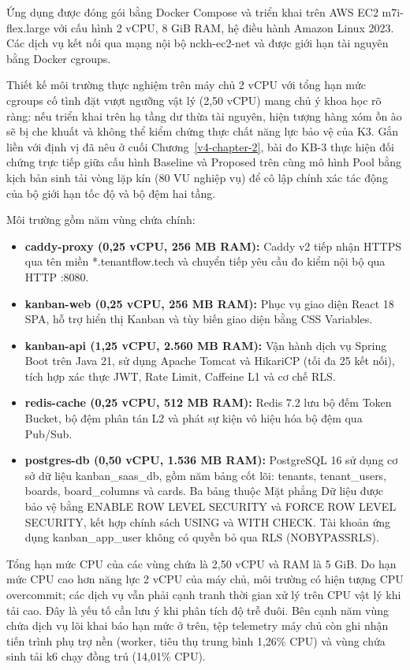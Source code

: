 Ứng dụng được đóng gói bằng Docker Compose và triển khai trên AWS EC2 m7i-flex.large với cấu hình 2 vCPU, 8 GiB RAM, hệ điều hành Amazon Linux 2023. Các dịch vụ kết nối qua mạng nội bộ nckh-ec2-net và được giới hạn tài nguyên bằng Docker cgroups.

Thiết kế môi trường thực nghiệm trên máy chủ 2 vCPU với tổng hạn mức cgroups cố tình đặt vượt ngưỡng vật lý (2,50 vCPU) mang chủ ý khoa học rõ ràng: nếu triển khai trên hạ tầng dư thừa tài nguyên, hiện tượng hàng xóm ồn ào sẽ bị che khuất và không thể kiểm chứng thực chất năng lực bảo vệ của K3. Gắn liền với định vị đã nêu ở cuối Chương~\ref{v4-chapter-2}, bài đo KB-3 thực hiện đối chứng trực tiếp giữa cấu hình Baseline và Proposed trên cùng mô hình Pool bằng kịch bản sinh tải vòng lặp kín (80 VU nghiệp vụ) để cô lập chính xác tác động của bộ giới hạn tốc độ và bộ đệm hai tầng.

Môi trường gồm năm vùng chứa chính:

\begin{itemize}
\tightlist
\item
  \textbf{caddy-proxy (0,25 vCPU, 256 MB RAM):} Caddy v2 tiếp nhận HTTPS qua tên miền *.tenantflow.tech và chuyển tiếp yêu cầu đo kiểm nội bộ qua HTTP :8080.
\item
  \textbf{kanban-web (0,25 vCPU, 256 MB RAM):} Phục vụ giao diện React 18 SPA, hỗ trợ hiển thị Kanban và tùy biến giao diện bằng CSS Variables.
\item
  \textbf{kanban-api (1,25 vCPU, 2.560 MB RAM):} Vận hành dịch vụ Spring Boot trên Java 21, sử dụng Apache Tomcat và HikariCP (tối đa 25 kết nối), tích hợp xác thực JWT, Rate Limit, Caffeine L1 và cơ chế RLS.
\item
  \textbf{redis-cache (0,25 vCPU, 512 MB RAM):} Redis 7.2 lưu bộ đếm Token Bucket, bộ đệm phân tán L2 và phát sự kiện vô hiệu hóa bộ đệm qua Pub/Sub.
\item
  \textbf{postgres-db (0,50 vCPU, 1.536 MB RAM):} PostgreSQL 16 sử dụng cơ sở dữ liệu kanban\_\allowbreak{}saas\_\allowbreak{}db, gồm năm bảng cốt lõi: tenants, tenant\_\allowbreak{}users, boards, board\_\allowbreak{}columns và cards. Ba bảng thuộc Mặt phẳng Dữ liệu được bảo vệ bằng ENABLE ROW LEVEL SECURITY và FORCE ROW LEVEL SECURITY, kết hợp chính sách USING và WITH CHECK. Tài khoản ứng dụng kanban\_\allowbreak{}app\_\allowbreak{}user không có quyền bỏ qua RLS (NOBYPASSRLS).
\end{itemize}

Tổng hạn mức CPU của các vùng chứa là 2,50 vCPU và RAM là 5 GiB. Do hạn mức CPU cao hơn năng lực 2 vCPU của máy chủ, môi trường có hiện tượng CPU overcommit; các dịch vụ vẫn phải cạnh tranh thời gian xử lý trên CPU vật lý khi tải cao. Đây là yếu tố cần lưu ý khi phân tích độ trễ đuôi. Bên cạnh năm vùng chứa dịch vụ lõi khai báo hạn mức ở trên, tệp telemetry máy chủ còn ghi nhận tiến trình phụ trợ nền (worker, tiêu thụ trung bình 1,26\% CPU) và vùng chứa sinh tải k6 chạy đồng trú (14,01\% CPU).

